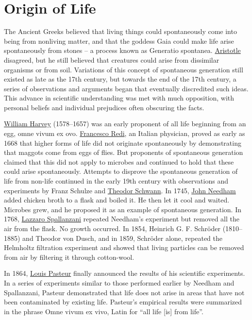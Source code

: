 \hypertarget{origin-of-life}{%
\section{Origin of Life}\label{origin-of-life}}

The Ancient Greeks believed that living things could spontaneously come into being from nonliving matter, and that the goddess Gaia could make life arise spontaneously from stones -- a process known as Generatio spontanea. \href{https://en.wikipedia.org/wiki/Aristotle}{Aristotle} disagreed, but he still believed that creatures could arise from dissimilar organisms or from soil. Variations of this concept of spontaneous generation still existed as late as the 17th century, but towards the end of the 17th century, a series of observations and arguments began that eventually discredited such ideas. This advance in scientific understanding was met with much opposition, with personal beliefs and individual prejudices often obscuring the facts.

\href{https://en.wikipedia.org/wiki/William_Harvey}{William Harvey} (1578--1657) was an early proponent of all life beginning from an egg, omne vivum ex ovo. \href{https://en.wikipedia.org/wiki/Francesco_Redi}{Francesco Redi}, an Italian physician, proved as early as 1668 that higher forms of life did not originate spontaneously by demonstrating that maggots come from eggs of flies. But proponents of spontaneous generation claimed that this did not apply to microbes and continued to hold that these could arise spontaneously. Attempts to disprove the spontaneous generation of life from non-life continued in the early 19th century with observations and experiments by Franz Schulze and \href{https://en.wikipedia.org/wiki/Theodor_Schwann}{Theodor Schwann}. In 1745, \href{https://en.wikipedia.org/wiki/John_Needham}{John Needham} added chicken broth to a flask and boiled it. He then let it cool and waited. Microbes grew, and he proposed it as an example of spontaneous generation. In 1768, \href{https://en.wikipedia.org/wiki/Lazzaro_Spallanzani}{Lazzaro Spallanzani} repeated Needham's experiment but removed all the air from the flask. No growth occurred. In 1854, Heinrich G. F. Schröder (1810--1885) and Theodor von Dusch, and in 1859, Schröder alone, repeated the Helmholtz filtration experiment and showed that living particles can be removed from air by filtering it through cotton-wool.

In 1864, \href{https://en.wikipedia.org/wiki/Louis_Pasteur}{Louis Pasteur} finally announced the results of his scientific experiments. In a series of experiments similar to those performed earlier by Needham and Spallanzani, Pasteur demonstrated that life does not arise in areas that have not been contaminated by existing life. Pasteur's empirical results were summarized in the phrase Omne vivum ex vivo, Latin for ``all life {[}is{]} from life''.

